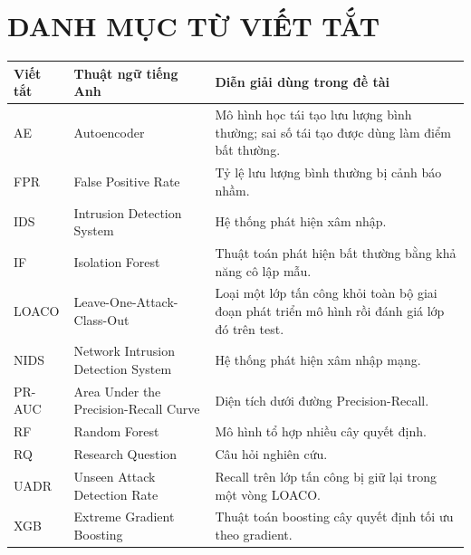 \documentclass[12pt,a4paper,oneside]{report}
\begin{document}
\clearpage
{}
\setcounter{page}{1}
\begingroup
\fontsize{10.5pt}{12.5pt}\selectfont
\tableofcontents
\endgroup
\clearpage
\begingroup
\fontsize{10.5pt}{12.5pt}\selectfont
{}\par
\vspace{0.45cm}
\makeatletter
{}
\makeatother
{}
\vspace{0.9cm}
\par
\vspace{0.45cm}
\makeatletter
{}
\makeatother
{}
\endgroup

\clearpage
\chapter*{DANH MỤC TỪ VIẾT TẮT}
\renewcommand{\arraystretch}{1.5}
\begin{longtable}{L{2.7cm}L{5.0cm}L{7.1cm}}
\toprule
\textbf{Viết tắt} & \textbf{Thuật ngữ tiếng Anh} & \textbf{Diễn giải dùng trong đề tài} \\
\midrule
AE & Autoencoder & Mô hình học tái tạo lưu lượng bình thường; sai số tái tạo được dùng làm điểm bất thường. \\
FPR & False Positive Rate & Tỷ lệ lưu lượng bình thường bị cảnh báo nhầm. \\
IDS & Intrusion Detection System & Hệ thống phát hiện xâm nhập. \\
IF & Isolation Forest & Thuật toán phát hiện bất thường bằng khả năng cô lập mẫu. \\
LOACO & Leave-One-Attack-Class-Out & Loại một lớp tấn công khỏi toàn bộ giai đoạn phát triển mô hình rồi đánh giá lớp đó trên test. \\
NIDS & Network Intrusion Detection System & Hệ thống phát hiện xâm nhập mạng. \\
PR-AUC & Area Under the Precision-Recall Curve & Diện tích dưới đường Precision-Recall. \\
RF & Random Forest & Mô hình tổ hợp nhiều cây quyết định. \\
RQ & Research Question & Câu hỏi nghiên cứu. \\
UADR & Unseen Attack Detection Rate & Recall trên lớp tấn công bị giữ lại trong một vòng LOACO. \\
XGB & Extreme Gradient Boosting & Thuật toán boosting cây quyết định tối ưu theo gradient. \\
\bottomrule
\end{longtable}
\end{document}
